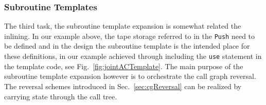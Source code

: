 \documentclass{book}
\newcommand{\refsec}[1]{{Sec.~\ref{#1}}}
\newcommand{\reffig}[1]{{Fig.~\ref{#1}}}
\begin{document}
\subsubsection{Subroutine Templates}\label{sec:templates}
The third task, the subroutine template expansion is somewhat related the inlining. 
In our example above, the tape storage referred to in the \lstinline{Push} need to be 
defined and in the design the subroutine template is the intended place for these definitions, 
in our example achieved through including the \lstinline{use} statement in the template code, 
see \reffig{fig:jointACTemplate}.
The main purpose of the subroutine template expansion however is to orchestrate the 
call graph reversal. The reversal schemes introduced in \refsec{sec:cgReversal}
can be realized by carrying state through the call tree. 
\end{document}
